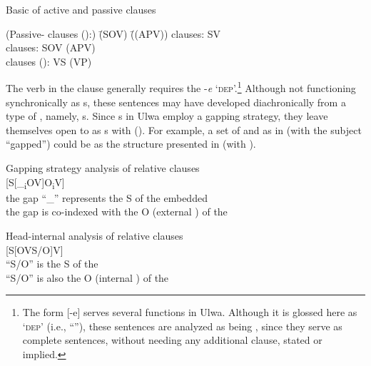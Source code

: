 \ea%
    \label{ex:syntax:275a}
            Basic  of active and passive clauses
\begin{tabbing}
{(Passive- clauses ():)} \= {(SOV)} \= {((APV))}\kill
{  clauses:} \> {SV} \> {}\\
{  clauses:} \> {SOV} \> ({APV)}\\
{ clauses ():} \> {VS} \> {(VP)}
\end{tabbing}
\z

The verb in the  clause generally requires the  -\textit{e} ‘\textsc{dep}’.\footnote{The form [-e] serves several functions in Ulwa. Although it is glossed here as ‘\textsc{dep}’ (i.e., “”), these  sentences are analyzed as being , since they serve as complete sentences, without needing any additional clause, stated or implied.} Although not functioning synchronically as s, these  sentences may have developed diachronically from a type of , namely, s. Since s in Ulwa employ a  gapping strategy, they leave themselves open to  as s with  (). For example, a set of  and  as in  (with the subject “gapped”) could be  as the structure presented in  (with ).


\ea%
    \label{ex:syntax:276}
          Gapping strategy analysis of relative clauses\\
    {[S[\_\textsubscript{i}OV]O\textsubscript{i}V]\\
    the gap “\_” represents the S of the embedded \\
    the gap is co-indexed with the O (external ) of the }
\z

\ea%
    \label{ex:syntax:277}
          Head-internal analysis of relative clauses\\
    {[S[OVS/O]V]\\
    “S/O” is the S of the \\
    “S/O” is also the O (internal ) of the }
\z

